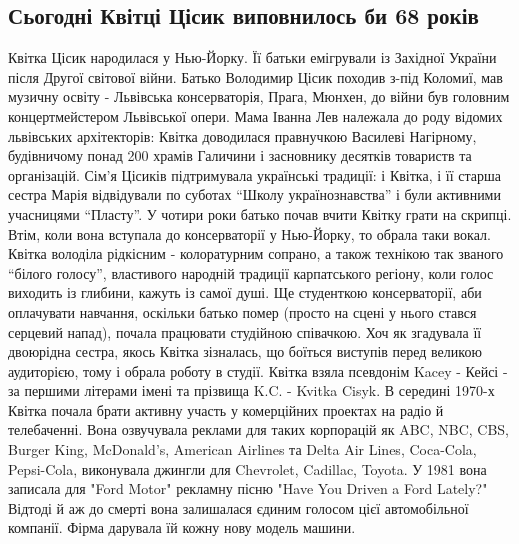  
 
 
 
 

\subsection{Сьогодні Квітці Цісик виповнилось би 68 років}

Квітка Цісик народилася у Нью-Йорку. Її батьки емігрували із Західної України після Другої світової війни. Батько Володимир Цісик походив з-під Коломиї, мав музичну освіту - Львівська консерваторія, Прага, Мюнхен, до війни був головним концертмейстером Львівської опери. 
Мама Іванна Лев належала до роду відомих львівських архітекторів: Квітка доводилася правнучкою Василеві Нагірному, будівничому понад 200 храмів Галичини і засновнику десятків товариств та організацій. 
Сім'я Цісиків підтримувала українські традиції: і Квітка, і її старша сестра Марія відвідували по суботах “Школу українознавства” і були активними учасницями “Пласту”. 
У чотири роки батько почав вчити Квітку грати на скрипці. Втім, коли вона вступала до консерваторії у Нью-Йорку, то обрала таки вокал. Квітка володіла рідкісним - колоратурним сопрано, а також технікою так званого “білого голосу”, властивого народній традиції карпатського регіону, коли голос виходить із глибини, кажуть із самої душі.
Ще студенткою консерваторії, аби оплачувати навчання, оскільки батько помер (просто на сцені у нього стався серцевий напад), почала працювати студійною співачкою. Хоч як згадувала її двоюрідна сестра, якось Квітка зізналась, що боїться виступів перед великою аудиторією, тому і обрала роботу в студії.
Квітка взяла псевдонім Kacey - Кейсі - за першими літерами імені та прізвища K.C. - Kvitka Cisyk. 
В середині 1970-х Квітка почала брати активну участь у комерційних проектах на радіо й телебаченні. Вона озвучувала реклами для таких корпорацій як ABC, NBC, CBS, Burger King, McDonald's, American Airlines та Delta Air Lines, Coca-Cola, Pepsi-Cola, виконувала джингли для Chevrolet, Cadillac, Toyota.
У 1981 вона записала для "Ford Motor" рекламну пісню "Have You Driven a Ford Lately?" Відтоді й аж до смерті вона залишалася єдиним голосом цієї автомобільної компанії. Фірма дарувала їй кожну нову модель машини. 
